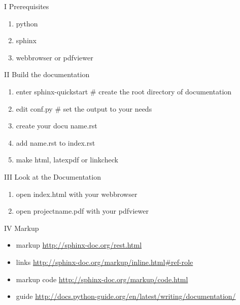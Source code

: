 \documentclass[letterpaper,10pt,english]{sphinxmanual}
\begin{document}
I Prerequisites
\begin{enumerate}
\item {} 
python

\item {} 
sphinx

\item {} 
webbrowser or pdfviewer

\end{enumerate}

II Build the documentation
\begin{enumerate}
\item {} 
enter sphinx-quickstart \# create the root directory of documentation

\item {} 
edit conf.py \# set the output to your needs

\item {} 
create your docu name.rst

\item {} 
add name.rst to index.rst

\item {} 
make html, latexpdf or linkcheck

\end{enumerate}

III Look at the Documentation
\begin{enumerate}
\item {} 
open index.html with your webbrowser

\item {} 
open projectname.pdf with your pdfviewer

\end{enumerate}

IV Markup
\begin{itemize}
\item {} 
markup \href{http://sphinx-doc.org/rest.html}{http://sphinx-doc.org/rest.html}

\item {} 
links \href{http://sphinx-doc.org/markup/inline.html\#ref-role}{http://sphinx-doc.org/markup/inline.html\#ref-role}

\item {} 
markup code \href{http://sphinx-doc.org/markup/code.html}{http://sphinx-doc.org/markup/code.html}

\item {} 
guide \href{http://docs.python-guide.org/en/latest/writing/documentation/}{http://docs.python-guide.org/en/latest/writing/documentation/}

\end{itemize}
\end{document}
